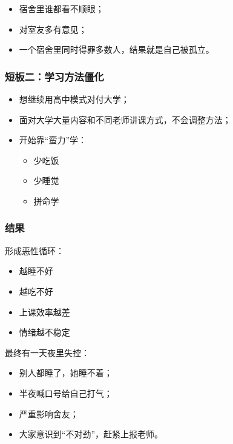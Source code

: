 \documentclass[
  chinese,
  9pt,
  a4paper,
]{ctexart}
\providecommand{\tightlist}{%
  \setlength{\itemsep}{0pt}\setlength{\parskip}{0pt}}
\begin{document}
\begin{itemize}
\tightlist
\item
  宿舍里谁都看不顺眼；
\item
  对室友多有意见；
\item
  一个宿舍里同时得罪多数人，结果就是自己被孤立。
\end{itemize}

\subsubsection{短板二：学习方法僵化}\label{ux77edux677fux4e8cux5b66ux4e60ux65b9ux6cd5ux50f5ux5316}

\begin{itemize}
\item
  想继续用高中模式对付大学；
\item
  面对大学大量内容和不同老师讲课方式，不会调整方法；
\item
  开始靠``蛮力''学：

  \begin{itemize}
  \tightlist
  \item
    少吃饭
  \item
    少睡觉
  \item
    拼命学
  \end{itemize}
\end{itemize}

\subsubsection{结果}\label{ux7ed3ux679c}

形成恶性循环：

\begin{itemize}
\tightlist
\item
  越睡不好
\item
  越吃不好
\item
  上课效率越差
\item
  情绪越不稳定
\end{itemize}

最终有一天夜里失控：

\begin{itemize}
\tightlist
\item
  别人都睡了，她睡不着；
\item
  半夜喊口号给自己打气；
\item
  严重影响舍友；
\item
  大家意识到``不对劲''，赶紧上报老师。
\end{itemize}
\end{document}
